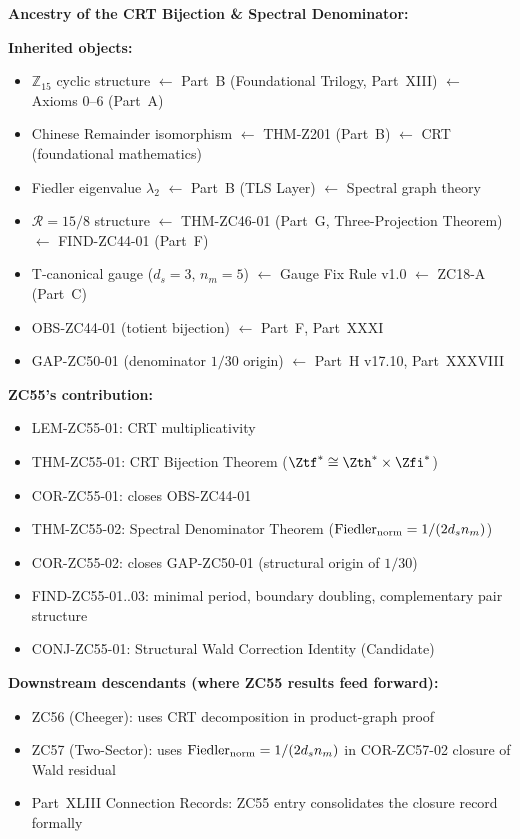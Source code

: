 \documentclass[12pt, a4paper]{article}
\begin{document}
\begin{genealogybox}[title={ZC55 Genealogy Map}]
\textbf{Ancestry of the CRT Bijection \& Spectral Denominator:}

\smallskip
\textbf{Inherited objects:}
\begin{itemize}[leftmargin=1.5em]
\item $\mathbb{Z}_{15}$ cyclic structure $\leftarrow$ Part~B (Foundational
  Trilogy, Part~XIII) $\leftarrow$ Axioms 0--6 (Part~A)
\item Chinese Remainder isomorphism $\leftarrow$ THM-Z201 (Part~B)
  $\leftarrow$ CRT (foundational mathematics)
\item Fiedler eigenvalue $\lambda_{2}$ $\leftarrow$ Part~B (TLS Layer)
  $\leftarrow$ Spectral graph theory
\item $\mathcal{R}=15/8$ structure $\leftarrow$ THM-ZC46-01 (Part~G,
  Three-Projection Theorem) $\leftarrow$ FIND-ZC44-01 (Part~F)
\item T-canonical gauge ($d_s=3$, $n_m=5$) $\leftarrow$ Gauge Fix Rule v1.0
  $\leftarrow$ ZC18-A (Part~C)
\item OBS-ZC44-01 (totient bijection) $\leftarrow$ Part~F, Part~XXXI
\item GAP-ZC50-01 (denominator $1/30$ origin) $\leftarrow$
  Part~H v17.10, Part~XXXVIII
\end{itemize}

\smallskip
\textbf{ZC55's contribution:}
\begin{itemize}[leftmargin=1.5em]
\item LEM-ZC55-01: CRT multiplicativity
\item THM-ZC55-01: CRT Bijection Theorem
  ($\Ztf^{*}\cong\Zth^{*}\times\Zfi^{*}$)
\item COR-ZC55-01: closes OBS-ZC44-01
\item THM-ZC55-02: Spectral Denominator Theorem
  ($\mathrm{Fiedler}_{\rm norm}=1/(2d_{s}n_{m})$)
\item COR-ZC55-02: closes GAP-ZC50-01 (structural origin of $1/30$)
\item FIND-ZC55-01..03: minimal period, boundary doubling,
  complementary pair structure
\item CONJ-ZC55-01: Structural Wald Correction Identity (Candidate)
\end{itemize}

\smallskip
\textbf{Downstream descendants (where ZC55 results feed forward):}
\begin{itemize}[leftmargin=1.5em]
\item ZC56 (Cheeger): uses CRT decomposition in product-graph proof
\item ZC57 (Two-Sector): uses $\mathrm{Fiedler}_{\rm norm}=1/(2d_s n_m)$
  in COR-ZC57-02 closure of Wald residual
\item Part~XLIII Connection Records: ZC55 entry consolidates the
  closure record formally
\end{itemize}
\end{genealogybox}
\end{document}
